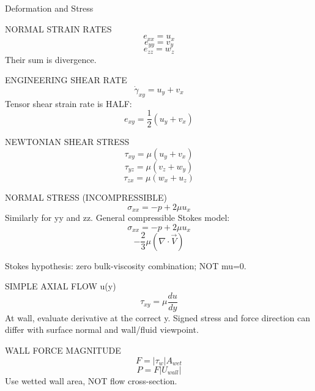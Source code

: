 Deformation and Stress

NORMAL STRAIN RATES
$$e_{xx}=u_x$$
$$e_{yy}=v_y$$
$$e_{zz}=w_z$$
Their sum is divergence.

ENGINEERING SHEAR RATE
$$\dot\gamma_{xy}=u_y+v_x$$
Tensor shear strain rate is HALF:
$$e_{xy}=\frac{1}{2}(u_y+v_x)$$

NEWTONIAN SHEAR STRESS
$$\tau_{xy}=\mu(u_y+v_x)$$
$$\tau_{yz}=\mu(v_z+w_y)$$
$$\tau_{zx}=\mu(w_x+u_z)$$

NORMAL STRESS (INCOMPRESSIBLE)
$$\sigma_{xx}=-p+2\mu u_x$$
Similarly for yy and zz.
General compressible Stokes model:
$$\sigma_{xx}=-p+2\mu u_x$$
$$-\frac{2}{3}\mu(\nabla\cdot\vec V)$$

Stokes hypothesis: zero bulk-viscosity combination; NOT mu=0.

SIMPLE AXIAL FLOW u(y)
$$\tau_{xy}=\mu\frac{du}{dy}$$
At wall, evaluate derivative at the correct y.
Signed stress and force direction can differ with surface normal and wall/fluid viewpoint.

WALL FORCE MAGNITUDE
$$F=|\tau_w|A_{wet}$$
$$P=F|U_{wall}|$$
Use wetted wall area, NOT flow cross-section.

